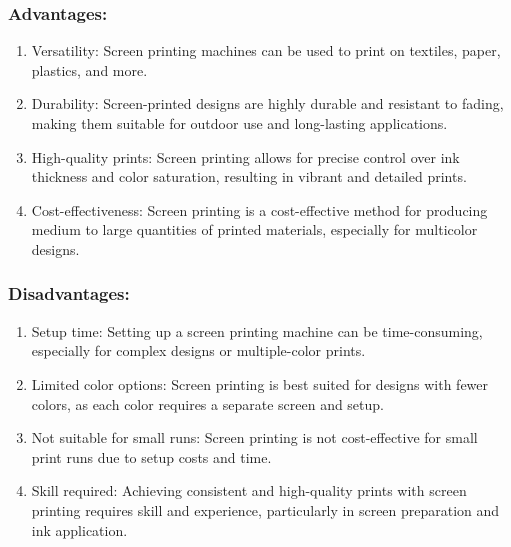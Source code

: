 \subsubsection{Advantages:}

\begin{enumerate}
\item
  Versatility: Screen printing machines can be used to print on
  textiles, paper, plastics, and more.
\item
  Durability: Screen-printed designs are highly durable and resistant to
  fading, making them suitable for outdoor use and long-lasting
  applications.
\item
  High-quality prints: Screen printing allows for precise control over
  ink thickness and color saturation, resulting in vibrant and detailed
  prints.
\item
  Cost-effectiveness: Screen printing is a cost-effective method for
  producing medium to large quantities of printed materials, especially
  for multicolor designs.
\end{enumerate}

\subsubsection{Disadvantages:}

\begin{enumerate}
\item
  Setup time: Setting up a screen printing machine can be
  time-consuming, especially for complex designs or multiple-color
  prints.
\item
  Limited color options: Screen printing is best suited for designs with
  fewer colors, as each color requires a separate screen and setup.
\item
  Not suitable for small runs: Screen printing is not cost-effective for
  small print runs due to setup costs and time.
\item
  Skill required: Achieving consistent and high-quality prints with
  screen printing requires skill and experience, particularly in screen
  preparation and ink application.
\end{enumerate}

